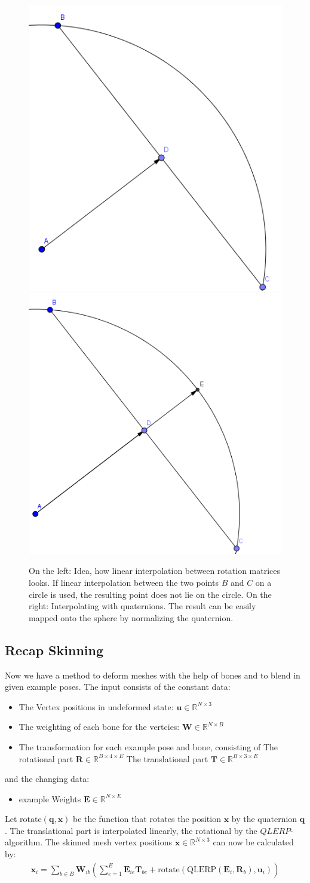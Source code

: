 \documentclass[
	11pt, 
	DIV10,
	a4paper, 
	oneside, 
	headings=normal, 
	captions=tableheading,
	final, 
	numbers=noenddot
]{scrartcl}
\begin{document}
\begin{figure}[tb]
	\centering
	\includegraphics[width=0.3\linewidth]{images/quatrot1} 
	\includegraphics[width=0.33\linewidth]{images/quatrot2} 
	\caption{\label{fig:image} On the left: Idea, how linear interpolation between rotation matrices looks. If linear interpolation between the two points $B$ and $C$ on a circle is used, the resulting point does not lie on the circle. On the right: Interpolating with quaternions. The result can be easily mapped onto the sphere by normalizing the quaternion.
	}
\end{figure}


\subsection{Recap Skinning}
Now we have a method to deform meshes with the help of bones and to blend in given example poses.
The input consists of the constant data:
\begin{itemize}
	\item The Vertex positions in undeformed state: $\bm u\in\mathbb{R}^{N\times 3}$
	\item The weighting of each bone for the vertcies: $\bm W\in\mathbb{R} ^{N \times B}$
	\item The transformation for each example pose and bone, consisting of
	\subitem The rotational part $\bm R\in\mathbb{R}^{B\times 4\times  E}$
	\subitem The translational part $\bm T\in\mathbb{R}^{B \times 3\times E}$
\end{itemize}
and the changing data:
\begin{itemize}
	\item example Weights $\bm{E}\in\mathbb{R}^{N\times E}$
\end{itemize}
Let $\text{rotate} (\bm{q},\bm{x})$ be the function that rotates the position $\bm{x}$ by the quaternion $\bm{q}$.
The translational part is interpolated linearly, the rotational by the $QLERP$-algorithm.
The skinned mesh vertex positions $\bm{x} \in \mathbb{R}^{N\times 3}$ can now be calculated by:
\begin{align}
\label{form:blend}
\bm{x}_i = \sum_{b\in B} \bm{W}_{ib}\left(\sum_{e=1}^{E}\bm{E}_{ie}\bm{T}_{be} + \text{rotate}(\text{QLERP}(\bm{E}_i,\bm{R}_b),\bm{u}_i)\right)
\end{align}
\end{document}
